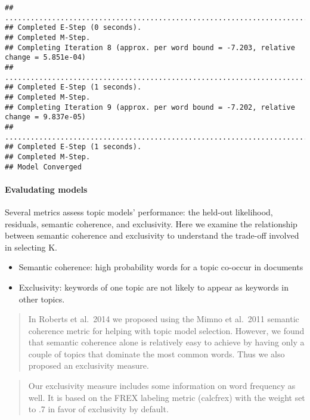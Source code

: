 \documentclass[
]{book}
\begin{document}
\begin{verbatim}
## ....................................................................................................
## Completed E-Step (0 seconds). 
## Completed M-Step. 
## Completing Iteration 8 (approx. per word bound = -7.203, relative change = 5.851e-04) 
## ....................................................................................................
## Completed E-Step (1 seconds). 
## Completed M-Step. 
## Completing Iteration 9 (approx. per word bound = -7.202, relative change = 9.837e-05) 
## ....................................................................................................
## Completed E-Step (1 seconds). 
## Completed M-Step. 
## Model Converged
\end{verbatim}

\hypertarget{evaludating-models}{%
\paragraph{Evaludating models}\label{evaludating-models}}

Several metrics assess topic models' performance: the held-out likelihood, residuals, semantic coherence, and exclusivity. Here we examine the relationship between semantic coherence and exclusivity to understand the trade-off involved in selecting K.

\begin{itemize}
\item
  Semantic coherence: high probability words for a topic co-occur in documents
\item
  Exclusivity: keywords of one topic are not likely to appear as keywords in other topics.
\end{itemize}

\begin{quote}
In Roberts et al.~2014 we proposed using the Mimno et al.~2011 semantic coherence metric for helping with topic model selection. However, we found that semantic coherence alone is relatively easy to achieve by having only a couple of topics that dominate the most common words. Thus we also proposed an exclusivity measure.
\end{quote}

\begin{quote}
Our exclusivity measure includes some information on word frequency as well. It is based on the FREX labeling metric (calcfrex) with the weight set to .7 in favor of exclusivity by default.
\end{quote}
\end{document}
